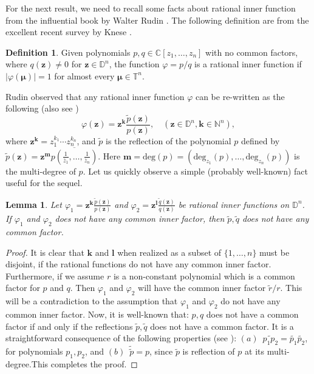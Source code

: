 \documentclass[12pt, a4 paper]{amsart}
\newcommand{\D}{\mathbb{D}}
\theoremstyle{definition}
\theoremstyle{plain}
\newtheorem{lem}[thm]{Lemma}
\theoremstyle{definition}
\newtheorem{defn}[thm]{Definition}
\numberwithin{equation}{section}
\let\phi=\varphi
\begin{document}
For the next result, we need to recall some facts about rational inner function from the influential book by Walter Rudin \cite{Rudin}. The following definition are from the excellent recent survey by Knese \cite{Knese}. 
\begin{defn}
Given polynomials $p,q \in \mathbb{C}[z_1, \ldots, z_n]$ with no common factors, where $q(\bm{z}) \neq 0$ for $\bm{z} \in \D^n$, the function $\phi = p/q$ is a rational inner function if $|\phi(\bm{\mu})| = 1 $ for almost every $\bm{\mu} \in \mathbb{T}^n$.
\end{defn}
Rudin \cite[Theorem 5.2.5]{Rudin} observed that any rational inner function $\phi$ can be re-written as the following (also see \cite[Theorem 1]{Knese})
\[
\phi(\bm{z}) = \bm{z}^{\bm{k}} \frac{\tilde{p}(\bm{z})}{p(\bm{z})}, \quad (\bm{z} \in \D^n, \bm{k} \in \mathbb{N}^n),
\]
where $\bm{z}^{\bm{k}} = z_1^{k_1} \cdots z_n^{k_n}$, and $\tilde{p}$ is the reflection of the polynomial $p$ defined by $\tilde{p}(\bm{z}) = \bm{z}^{\bm{m}}\overline{p(\frac{1}{\bar z_1}, \ldots, \frac{1}{\bar z_n})}$. Here $\bm{m} = \mbox{deg}(p) = (\mbox{deg}_{z_1}(p), \ldots, \mbox{deg}_{z_n}(p))$ is the multi-degree of $p$. 
Let us quickly observe a simple (probably well-known) fact useful for the sequel.
\begin{lem}\label{common}
Let $\phi_1 = \bm{z}^{\bm{k}}\frac{\tilde{p}(\bm{z})}{p(\bm{z})}$ and $\phi_2 =  \bm{z}^{\bm{l}} \frac{\tilde{q}(\bm{z})}{q(\bm{z})}$ be rational inner functions on $\D^n$. If $\phi_1$ and $\phi_2$ does not have any common inner factor, then $\tilde{p}, \tilde{q}$ does not have any common factor.
\end{lem}
\begin{proof}
It is clear that $\bm{k}$ and $\bm{l}$ when realized as a subset of $\{1,\ldots,n\}$ must be disjoint, if the rational functions do not have any common inner factor. Furthermore, if we assume $r$ is a non-constant polynomial which is a common factor for $p$ and $q$. Then $\phi_1$ and $\phi_2$ will have the common inner factor $\tilde{r}/r$. This will be a contradiction to the assumption that $\phi_1$ and $\phi_2$ do not have any common inner factor. Now, it is well-known that: $p, q$ does not have a common factor if and only if the reflections $\tilde{p}, \tilde{q}$ does not have a common factor. It is a straightforward consequence of the following properties (see \cite[Section 2]{AJMJES}): $(a)$~$\widetilde{p_1 p_2}=\tilde{p_1}\tilde{p_2}$, for polynomials $p_1,p_2$, and $(b)$~$\tilde{\tilde{p}}=p$, since $\tilde{p}$ is reflection of $p$ at its multi-degree.This completes the proof.
\end{proof}
\end{document}
